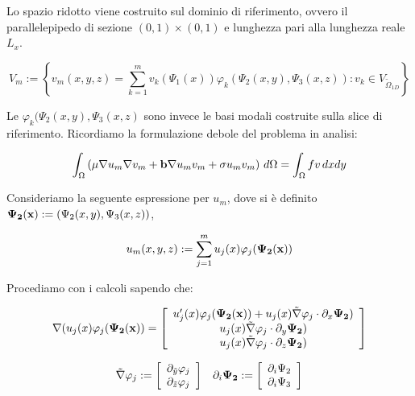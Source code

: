 Lo spazio ridotto viene costruito sul dominio di riferimento, ovvero il parallelepipedo di sezione $(0,1)\times(0,1)$ e lunghezza pari alla lunghezza reale $L_x$.

\begin{equation}
\label{eq: spazio ridotto}
V_m := \left\{ v_m(x,y,z) = \sum_{k=1}^m v_k(\Psi_1(x))\varphi_k(\Psi_2(x,y),\Psi_3(x,z)): v_k \in V_{\tilde{\Omega}_{1D}} \right\}
\end{equation}

Le $\varphi_k(\Psi_2(x,y),\Psi_3(x,z)$ sono invece le basi modali costruite sulla slice di riferimento. Ricordiamo la formulazione debole del problema in analisi:

\begin{multline}
\int_\Omega\left(\mu\nabla u_m\nabla v_m + \mathbf{b}\nabla u_mv_m+\sigma u_mv_m\right)\,d\Omega
=\int_\Omega fv \,dxdy
\end{multline}

Consideriamo la seguente espressione per $u_m$, dove si \`e definito $\mathbf{\Psi_2}(\mathbf{x}):=(\Psi_2(x,y),\Psi_3(x,z))$,

\begin{equation}
u_m(x,y,z) := \sum_{j=1}^m u_j(x)\varphi_j(\mathbf{\Psi_2}(\mathbf{x}))
\end{equation}

Procediamo con i calcoli sapendo che:

\begin{equation}
\nabla(u_j(x)\varphi_j(\mathbf{\Psi_2}(\mathbf{x})) = \left[ 
\begin{array}{c}
u_j'(x)\varphi_j(\mathbf{\Psi_2}(\mathbf{x})) + u_j(x)\tilde{\nabla}\varphi_j\cdot \partial_x \mathbf{\Psi_2}) \\
u_j(x)\tilde{\nabla}\varphi_j\cdot \partial_y \mathbf{\Psi_2})\\
u_j(x)\tilde{\nabla}\varphi_j\cdot \partial_z \mathbf{\Psi_2})
\end{array}
\right]
\end{equation}


\begin{equation}
\begin{array}{c c}
\tilde{\nabla}\varphi_j := \left[
\begin{array}{c}
\partial_{\tilde{y}}\varphi_j \\
\partial_{\tilde{z}}\varphi_j
\end{array}
\right]
&
\partial_i\mathbf{\Psi_2} := \left[
\begin{array}{c}
\partial_i\Psi_2 \\
\partial_i\Psi_3
\end{array}
\right]
\end{array}
\end{equation}

